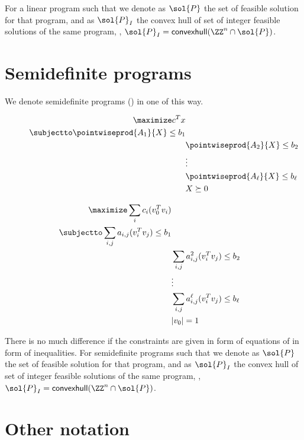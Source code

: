 \documentclass[a4paper,justified]{tufte-handout}
\begin{document}
For a linear program such that we denote as $ \sol{P} $ the set of
feasible solution for that program, and as $ \sol{P}_{I} $ the convex
hull of set of integer feasible solutions of the same program, \ie, $
\sol{P}_{I} = \mathsf{convexhull}(\ZZ^{n} \cap \sol{P}) $.

\section{Semidefinite programs}

We denote semidefinite programs (\sdp) in one of this way.

\begin{figure}
\begin{minipage}[t]{0.5\textwidth}
\begin{alignat*}{2}
  \maximize c^{T}x\\
  \subjectto \pointwiseprod{A_{1}}{X} \leq b_{1}\\
  & \pointwiseprod{A_{2}}{X} \leq b_{2}\\
  & \vdots \\
  & \pointwiseprod{A_{\ell}}{X} \leq b_{\ell}\\
  & X \succeq 0
\end{alignat*}
\end{minipage}
\begin{minipage}[t]{0.5\textwidth}
\begin{alignat*}{2}
  \maximize \sum_{i}c_{i} (v_{0}^{T}v_{i}) \\
  \subjectto \sum_{i,j} a_{i,j} (v^{T}_{i}v_{j})\leq b_{1}\\
  & \sum_{i,j} a^{2}_{i,j} (v^{T}_{i}v_{j})\leq b_{2}\\
  & \vdots \\
  & \sum_{i,j} a^{\ell}_{i,j} (v^{T}_{i}v_{j})\leq b_{\ell}\\
  & |v_{0}| = 1
\end{alignat*}
\end{minipage}
\end{figure}

There is no much difference if the constraints are given in form of
equations of in form of inequalities.  For semidefinite programs such
that we denote as $ \sol{P} $ the set of feasible solution for that
program, and as $ \sol{P}_{I} $ the convex hull of set of integer
feasible solutions of the same program, \ie, $ \sol{P}_{I} =
\mathsf{convexhull}(\ZZ^{n} \cap \sol{P}) $.


\section{Other notation}
\end{document}

